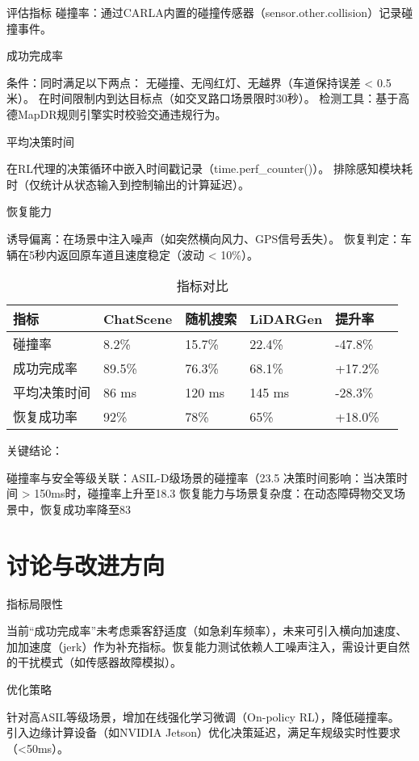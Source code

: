 评估指标
碰撞率：通过CARLA内置的碰撞传感器（sensor.other.collision）记录碰撞事件。

成功完成率

条件：同时满足以下两点：
无碰撞、无闯红灯、无越界（车道保持误差 < 0.5米）。
在时间限制内到达目标点（如交叉路口场景限时30秒）。
检测工具：基于高德MapDR规则引擎实时校验交通违规行为。

平均决策时间

在RL代理的决策循环中嵌入时间戳记录（time.perf\_counter()）。
排除感知模块耗时（仅统计从状态输入到控制输出的计算延迟）。

恢复能力

诱导偏离：在场景中注入噪声（如突然横向风力、GPS信号丢失）。
恢复判定：车辆在5秒内返回原车道且速度稳定（波动 < 10\%）。


\begin{table}[htb]
	\centering
	\caption{指标对比}
	\label{T.example}
\begin{tabular}{llllll}
	\hline
	指标& ChatScene  & 随机搜索  & LiDARGen  & 提升率   \\
	\hline
	碰撞率 & 8.2\%  & 15.7\% & 22.4\% 	&  -47.8\%	\\
	\hline
	成功完成率 & 89.5\% & 76.3\% & 68.1\% 	& 	 +17.2\%	\\
	\hline
	平均决策时间 & 86 ms & 120 ms & 145 ms&	-28.3\%	\\
	\hline
	恢复成功率 & 92\% & 78\% & 65\%	&  +18.0\%	\\
	
	\hline
\end{tabular}
\end{table}


关键结论：


碰撞率与安全等级关联：ASIL-D级场景的碰撞率（23.5%
决策时间影响：当决策时间 > 150ms时，碰撞率上升至18.3%
恢复能力与场景复杂度：在动态障碍物交叉场景中，恢复成功率降至83%



\section{讨论与改进方向}
指标局限性

当前“成功完成率”未考虑乘客舒适度（如急刹车频率），未来可引入横向加速度、加加速度（jerk）作为补充指标。恢复能力测试依赖人工噪声注入，需设计更自然的干扰模式（如传感器故障模拟）。

优化策略

针对高ASIL等级场景，增加在线强化学习微调（On-policy RL），降低碰撞率。
引入边缘计算设备（如NVIDIA Jetson）优化决策延迟，满足车规级实时性要求（<50ms）。

\newpage
